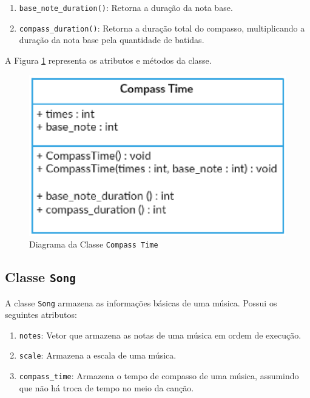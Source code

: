       \begin{enumerate}
        \item \texttt{base\_note\_duration()}: Retorna a duração da nota base.
        \item \texttt{compass\_duration()}: Retorna a duração total do compasso, multiplicando a duração da nota base pela quantidade de batidas.
      \end{enumerate}


      A Figura \ref{compasstimeclass} representa os atributos e métodos da classe.

      \begin{figure}[htb]
        \centering
        \includegraphics[scale=0.7]{figuras/compasstimeclass.eps}
        \caption{Diagrama da Classe \texttt{Compass Time}}
        \label{compasstimeclass}
      \end{figure}

    \subsection[Classe \texttt{Song}]{Classe \texttt{Song}}

      A classe \texttt{Song} armazena as informações básicas de uma música. Possui os seguintes atributos:

      \begin{enumerate}
        \item \texttt{notes}: Vetor que armazena as notas de uma música em ordem de execução.
        \item \texttt{scale}: Armazena a escala de uma música.
        \item \texttt{compass\_time}: Armazena o tempo de compasso de uma música, assumindo que não há troca de tempo no meio da canção.
      \end{enumerate}

